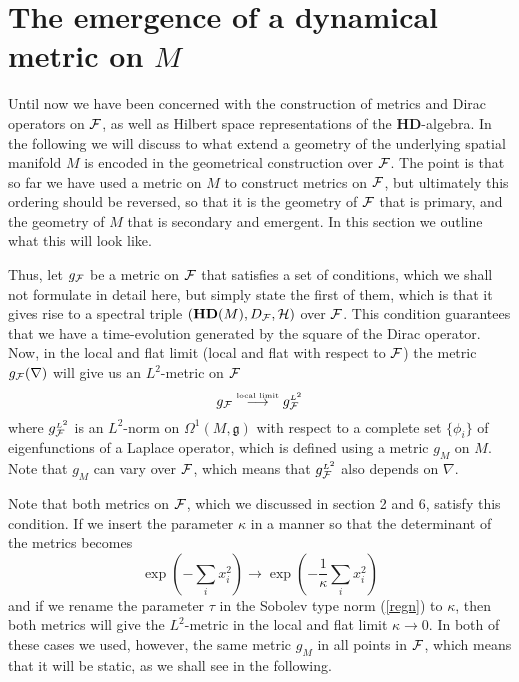 \documentclass[letterpaper,11pt]{article}
\def\OO{\Omega}
\def\cf{{\cal F}}
\def\ch{{\cal H}}
\begin{document}
\section{The emergence of a dynamical metric on $M$}


Until now we have been concerned with the construction of metrics and Dirac operators on $\cf$, as well as Hilbert space representations of the $\mathbf{HD}$-algebra. In the following we will discuss to what extend a geometry of the underlying spatial manifold $M$ is encoded in the geometrical construction over $\cf$. The point is that so far we have used a metric on $M$ to construct metrics on $\cf$, but ultimately this ordering should be reversed, so that it is the geometry of $\cf$ that is primary, and the geometry of $M$ that is secondary and emergent. In this section we outline what this will look like.



Thus, let
$g_{\cf}$ be a metric on $\cf$ that satisfies a set of conditions, which we shall not formulate in detail here, but simply state the first of them, which is that it gives rise to a spectral triple $(\mathbf{HD}(M),D_\cf,\ch)$ over $\cf$. This condition guarantees that we have a time-evolution generated by the square of the Dirac operator. 
Now, in the local and flat limit (local and flat with respect to $\cf$) the metric $g_{\cf}(\nabla )$ will give us an $L^2$-metric on $\cf$
$$
 g_{\cf} \stackrel{\mbox{\tiny local limit}}{\longrightarrow}  g_{\cf}^{\mbox{\tiny$L^2$}}
$$
 where $g_{\cf}^{\mbox{\tiny$L^2$}}$ is an $L^2$-norm on $\OO^1(M,\mathfrak{g})$ with respect to a complete set $\{\phi_i\}$ of eigenfunctions of a Laplace operator, which is defined using a metric $g_M$ on $M$. Note that $g_M$ can vary over $\cf$, which means that $g_{\cf}^{\mbox{\tiny$L^2$}}$ also depends on $\nabla$.  

Note that both metrics on $\cf$, which we discussed in section 2 and 6, satisfy this condition. If we insert the parameter $\kappa$ in a manner so that the determinant of the metrics becomes
$$
\exp(-\sum_i x_i^2)\rightarrow \exp(-\frac{1}{\kappa}\sum_i x_i^2)
$$
and if we rename the parameter $\tau$ in the Sobolev type norm (\ref{regn}) to $\kappa$, 
then both metrics will give the $L^2$-metric in the local and flat limit $\kappa\rightarrow 0$. In both of these cases we used, however, the same metric $g_M$ in all points in $\cf$, which means that it will be static, as we shall see in the following. 
\end{document}
